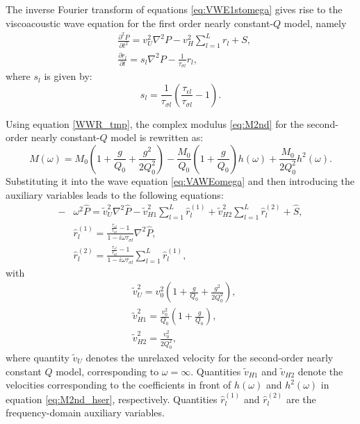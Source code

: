 \documentclass[article]{./macros/elsarticle_qh}
\begin{document}
The inverse Fourier transform of equations \ref{eq:VWE1stomega} gives rise to the viscoacoustic wave equation for the first order nearly constant-$Q$ model, namely
\begin{equation}
\begin{split}
& \frac{\partial^2 P}{\partial t^2} = v_{U}^2 \nabla^2 P
- v_{H}^2 \sum_{l=1}^{L} r_{l} 
+ S , \\
& \frac{\partial r_{l}}{\partial t} = s_{l} \nabla^2 P
- \frac{1}{\tau_{\sigma l}} r_{l} ,
\end{split}
\end{equation}
where $s_{l}$ is given by:
\begin{equation}
s_{l} = \frac{1}{\tau_{\sigma l}} 
\left(\frac{\tau_{\epsilon l}}{\tau_{\sigma l}} - 1 \right) . 
\end{equation}

Using equation \ref{WWR_tmp}, the complex modulus \ref{eq:M2nd} for the second-order nearly constant-$Q$ model is rewritten as:
\begin{equation} \label{eq:M2nd_hser}
M(\omega) = M_{0} \left(1 + \frac{g}{Q_{0}} + \frac{g^2}{2Q_{0}^2} \right) 
- \frac{M_{0}}{Q_{0}} \left(1 + \frac{g}{Q_{0}} \right) h(\omega) 
+ \frac{M_{0}}{2Q_{0}^2} h^2 (\omega).
\end{equation}
Substituting it into the wave equation \ref{eq:VAWEomega} and then introducing the auxiliary variables leads to the following equations:
\begin{equation} \label{eq:VWE2ndomega}
\begin{split}
- &\omega^2 \hat{P} = \tilde{v}_{U}^2 \nabla^2 \hat{P} 
- \tilde{v}_{H1}^2 \sum_{l=1}^{L} \hat{r}_{l}^{(1)} 
+ \tilde{v}_{H2}^2 \sum_{l=1}^{L} \hat{r}_{l}^{(2)} 
+ \hat{S}, \\
& \hat{r}_{l}^{(1)} = 
\frac{\frac{\tau_{\epsilon l}}{\tau_{\sigma l}}-1}
{1-i\omega\tau_{\sigma l}} \nabla^2 \hat{P} , \\
& \hat{r}_{l}^{(2)} =  
\frac{\frac{\tau_{\epsilon l}}{\tau_{\sigma l}}-1}
{1-i\omega\tau_{\sigma l}} \sum_{l=1}^{L} \hat{r}_{l}^{(1)} ,
\end{split}
\end{equation}
with
\begin{align}
& \tilde{v}_{U}^2 = v_{0}^2 \left(
1 + \frac{g}{Q_{0}} + \frac{g^2}{2Q_{0}^2} \right), \\
& \tilde{v}_{H1}^2 = \frac{v_{0}^2}{Q_{0}} \left(1 + \frac{g}{Q_{0}} \right), \\
& \tilde{v}_{H2}^2 = \frac{v_{0}^2}{2Q_{0}^2} ,
\end{align}
where quantity $\tilde{v}_{U}$ denotes the unrelaxed velocity for the second-order nearly constant $Q$ model, corresponding to $\omega=\infty$. Quantities $\tilde{v}_{H1}$ and $\tilde{v}_{H2}$ denote the velocities corresponding to the coefficients in front of $h(\omega)$ and $h^2(\omega)$ in equation \ref{eq:M2nd_hser}, respectively. Quantities $\hat{r}_{l}^{(1)}$ and $\hat{r}_{l}^{(2)}$ are the frequency-domain auxiliary variables.
\end{document}
